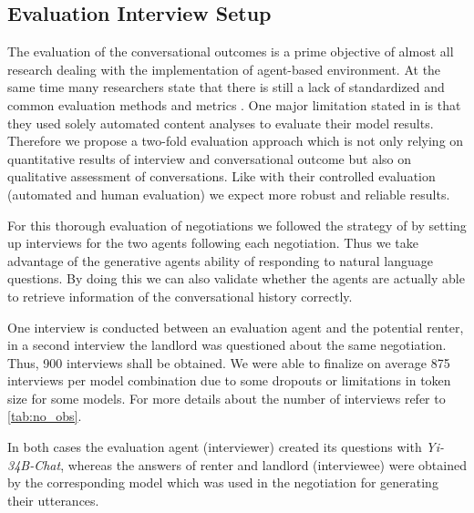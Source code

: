 \documentclass[runningheads]{llncs}
\begin{document}
\subsection{Evaluation Interview Setup}\label{evaluation_setup}
The evaluation of the conversational outcomes is a prime objective of almost all research dealing with the implementation of agent-based environment. At the same time many researchers state that there is still a lack of standardized and common evaluation methods and metrics \cite{cheng_compost_2023,park_generative_2023,tornberg_simulating_2023}. One major limitation stated in \cite[p.7]{tornberg_simulating_2023} is that they used solely automated content analyses to evaluate their model results. Therefore we propose a two-fold evaluation approach which is not only relying on quantitative results of interview and conversational outcome but also on qualitative assessment of conversations. Like \cite[p.13-14]{park_generative_2023} with their controlled evaluation (automated and human evaluation) we expect more robust and reliable results.

For this thorough evaluation of negotiations we followed the strategy of \cite{park_generative_2023} by setting up interviews for the two agents following each negotiation. Thus we take advantage of the generative agents ability of responding to natural language questions. By doing this we can also validate whether the agents are actually able to retrieve information of the conversational history correctly. 

One interview is conducted between an evaluation agent and the potential renter, in a second interview the landlord was questioned about the same negotiation. Thus, 900 interviews shall be obtained. We were able to finalize on average 875 interviews per model combination due to some dropouts or limitations in token size for some models. For more details about the number of interviews refer to \ref{tab:no_obs}.

In both cases the evaluation agent (interviewer) created its questions with \textit{Yi-34B-Chat}, whereas the answers of renter and landlord (interviewee) were obtained by the corresponding model which was used in the negotiation for generating their utterances.
\end{document}
